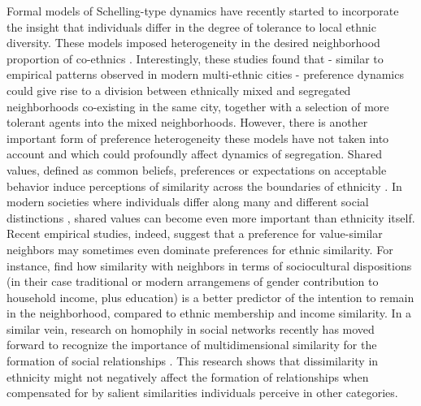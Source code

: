 \documentclass[
]{article}
\begin{document}
Formal models of Schelling-type dynamics have recently started to
incorporate the insight that individuals differ in the degree of
tolerance to local ethnic diversity. These models imposed heterogeneity
in the desired neighborhood proportion of co-ethnics
\citep{xie2012modeling, hatna2014combining}. Interestingly, these
studies found that - similar to empirical patterns observed in modern
multi-ethnic cities - preference dynamics could give rise to a division
between ethnically mixed and segregated neighborhoods co-existing in the
same city, together with a selection of more tolerant agents into the
mixed neighborhoods. However, there is another important form of
preference heterogeneity these models have not taken into account and
which could profoundly affect dynamics of segregation. Shared values,
defined as common beliefs, preferences or expectations on acceptable
behavior induce perceptions of similarity across the boundaries of
ethnicity \citep{wimmer2013ethnic,bail2008configuration}. In modern
societies where individuals differ along many and different social
distinctions \citep{vertovec2007super}, shared values can become even
more important than ethnicity itself. Recent empirical studies, indeed,
suggest that a preference for value-similar neighbors may sometimes even
dominate preferences for ethnic similarity. For
instance,\cite{van2019sociocultural} find how similarity with neighbors
in terms of sociocultural dispositions (in their case traditional or
modern arrangemens of gender contribution to household income, plus
education) is a better predictor of the intention to remain in the
neighborhood, compared to ethnic membership and income similarity. In a
similar vein, research on homophily in social networks recently has
moved forward to recognize the importance of multidimensional similarity
for the formation of social relationships
\citep{block2014multidimensional,hooijsma2020multidimensional}. This
research shows that dissimilarity in ethnicity might not negatively
affect the formation of relationships when compensated for by salient
similarities individuals perceive in other categories.
\end{document}
